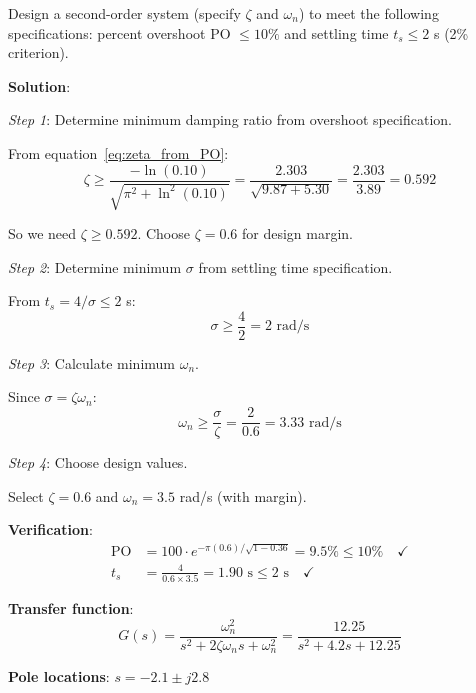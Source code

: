 \begin{examplebox}
Design a second-order system (specify $\zeta$ and $\omega_n$) to meet the following specifications: percent overshoot PO $\leq 10\%$ and settling time $t_s \leq 2$ s (2\% criterion).

\textbf{Solution}:

\textit{Step 1}: Determine minimum damping ratio from overshoot specification.

From equation~\eqref{eq:zeta_from_PO}:
\begin{equation}
    \zeta \geq \frac{-\ln(0.10)}{\sqrt{\pi^2 + \ln^2(0.10)}} = \frac{2.303}{\sqrt{9.87 + 5.30}} = \frac{2.303}{3.89} = 0.592
\end{equation}

So we need $\zeta \geq 0.592$. Choose $\zeta = 0.6$ for design margin.

\textit{Step 2}: Determine minimum $\sigma$ from settling time specification.

From $t_s = 4/\sigma \leq 2$ s:
\begin{equation}
    \sigma \geq \frac{4}{2} = 2 \text{ rad/s}
\end{equation}

\textit{Step 3}: Calculate minimum $\omega_n$.

Since $\sigma = \zeta\omega_n$:
\begin{equation}
    \omega_n \geq \frac{\sigma}{\zeta} = \frac{2}{0.6} = 3.33 \text{ rad/s}
\end{equation}

\textit{Step 4}: Choose design values.

Select $\zeta = 0.6$ and $\omega_n = 3.5$ rad/s (with margin).

\textbf{Verification}:
\begin{align}
    \text{PO} &= 100 \cdot e^{-\pi(0.6)/\sqrt{1-0.36}} = 9.5\% \leq 10\% \quad \checkmark \\
    t_s &= \frac{4}{0.6 \times 3.5} = 1.90 \text{ s} \leq 2 \text{ s} \quad \checkmark
\end{align}

\textbf{Transfer function}:
\begin{equation}
    G(s) = \frac{\omega_n^2}{s^2 + 2\zeta\omega_n s + \omega_n^2} = \frac{12.25}{s^2 + 4.2s + 12.25}
\end{equation}

\textbf{Pole locations}: $s = -2.1 \pm j2.8$
\end{examplebox}


